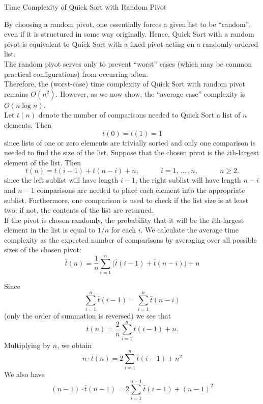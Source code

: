 \documentclass[smaller,hyperref={CJKbookmarks=true}]{beamer}
\begin{document}
\begin{frame}{Time Complexity of Quick Sort with Random Pivot}
\begin{spacing}{1.05}
By choosing a random pivot, one essentially forces a given list to be
``random'', even if it is structured in some way originally. Hence, Quick
Sort with a random pivot is equivalent to Quick Sort with a fixed pivot
acting on a randomly ordered list.\\[5pt]
The random pivot serves only to prevent ``worst'' cases (which may be
common practical configurations) from occurring often.\\[5pt]
Therefore, the (worst-case) time complexity of Quick Sort with random
pivot remains $O(n^2)$. However, as we now show, the ``average case'' complexity is $O(n\log n)$.\\[5pt]
Let $t(n)$ denote the number of comparisons needed to Quick Sort a list of $n$ elements. Then
\[t(0)=t(1)=1\]
since lists of one or zero elements are trivially sorted and only one
comparison is needed to find the size of the list.
\newpage
Suppose that the chosen pivot is the $i$th-largest element of the list. Then
\[t(n)=t(i-1)+t(n-i)+n,\qquad\quad i=1,\,...\,,n,\qquad\quad n\geq2.\]
since the left sublist will have length $i - 1$, the right sublist will have
length $n - i$ and $n - 1$ comparisons are needed to place each element into
the appropriate sublist. Furthermore, one comparison is used to check if
the list size is at least two; if not, the contents of the list are returned.\\[3pt]
If the pivot is chosen randomly, the probability that it will be the
$i$th-largest element in the list is equal to $1/n$ for each $i$. We calculate the
average time complexity as the expected number of comparisons by
averaging over all possible sizes of the chosen pivot:
\[\bar{t}(n)=\frac{1}{n}\sum_{i=1}^{n}\big(
\bar{t}(i-1)+\bar{t}(n-i)\big)+n\]
\end{spacing}
\newpage
\begin{spacing}{0.8}
Since
\[\sum_{i=1}^{n}\bar{t}(i-1)=\sum_{i=1}^{n}\bar{t}
(n-i)\]
(only the order of summation is reversed) we see that
\[\bar{t}(n)=\frac{2}{n}\sum_{i=1}^{n}
\bar{t}(i-1)+n.\]
Multiplying by $n$, we obtain
\begin{equation}\label{2.5.5}
n\cdot\bar{t}(n)=2\sum_{i=1}^{n}\bar{t}(i-1)+n^2
\end{equation}
We also have
\begin{equation}\label{2.5.6}
(n-1)\cdot\bar{t}(n-1)=2\sum_{i=1}^{n-1}\bar{t}(i-1)+(n-1)^2

\end{equation}
\end{spacing}
\end{frame}
\end{document}
